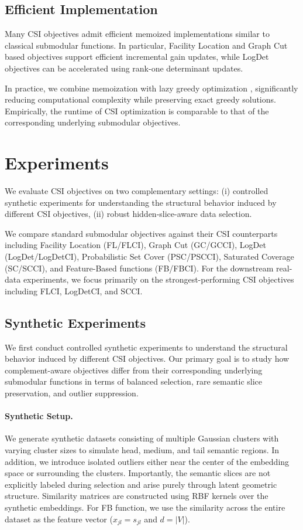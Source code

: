 \documentclass[11pt]{article}
\begin{document}
\subsection{Efficient Implementation}

Many CSI objectives admit efficient memoized implementations similar to classical submodular functions. In particular, Facility Location and Graph Cut based objectives support efficient incremental gain updates, while LogDet objectives can be accelerated using rank-one determinant updates.

In practice, we combine memoization with lazy greedy optimization \cite{minoux1978accelerated,iyer2019memoization}, significantly reducing computational complexity while preserving exact greedy solutions. Empirically, the runtime of CSI optimization is comparable to that of the corresponding underlying submodular objectives.


\section{Experiments}

We evaluate CSI objectives on two complementary settings:
(i) controlled synthetic experiments for understanding the structural behavior induced by different CSI objectives,
(ii) robust hidden-slice-aware data selection. 

We compare standard submodular objectives against their CSI counterparts including Facility Location (FL/FLCI), Graph Cut (GC/GCCI), LogDet (LogDet/LogDetCI), Probabilistic Set Cover (PSC/PSCCI), Saturated Coverage (SC/SCCI), and Feature-Based functions (FB/FBCI). For the downstream real-data experiments, we focus primarily on the strongest-performing CSI objectives including FLCI, LogDetCI, and SCCI.

\subsection{Synthetic Experiments}

We first conduct controlled synthetic experiments to understand the structural behavior induced by different CSI objectives. Our primary goal is to study how complement-aware objectives differ from their corresponding underlying submodular functions in terms of balanced selection, rare semantic slice preservation, and outlier suppression.

\paragraph{Synthetic Setup.}
We generate synthetic datasets consisting of multiple Gaussian clusters with varying cluster sizes to simulate head, medium, and tail semantic regions. In addition, we introduce isolated outliers either near the center of the embedding space or surrounding the clusters. Importantly, the semantic slices are not explicitly labeled during selection and arise purely through latent geometric structure. Similarity matrices are constructed using RBF kernels over the synthetic embeddings. For FB function, we use the similarity across the entire dataset as the feature vector ($x_{jl} = s_{jl}$ and $d = |V|$).
\end{document}
